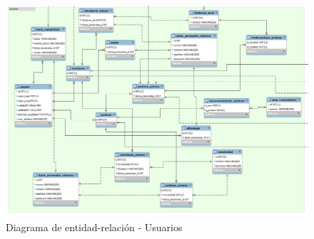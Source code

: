 \documentclass[11pt]{book}
\begin{document}
	\begin{landscape}
		\begin{figure}[p]
			\centering
			\includegraphics[scale=0.6]{usuarios}
			\caption{Diagrama de entidad-relación - Usuarios}
			\label{fig:usuarios}
		\end{figure}
	\end{landscape}
	
\end{document}
